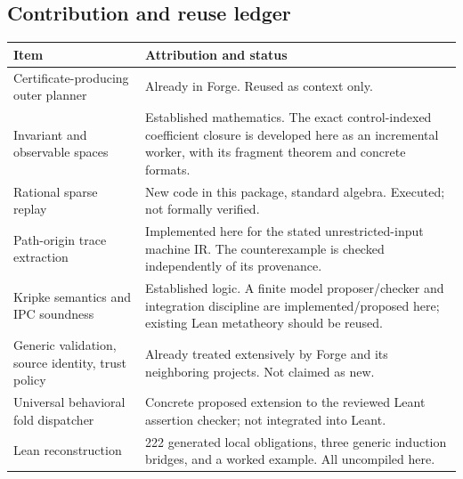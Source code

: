 \subsection{Contribution and reuse ledger}
\begin{longtable}{@{}P{0.31\textwidth}P{0.61\textwidth}@{}}
\toprule
Item & Attribution and status \\
\midrule
\endhead
Certificate-producing outer planner & Already in Forge. Reused as context only. \\
Invariant and observable spaces & Established mathematics. The exact control-indexed coefficient closure is developed here as an incremental worker, with its fragment theorem and concrete formats. \\
Rational sparse replay & New code in this package, standard algebra. Executed; not formally verified. \\
Path-origin trace extraction & Implemented here for the stated unrestricted-input machine IR. The counterexample is checked independently of its provenance. \\
Kripke semantics and IPC soundness & Established logic. A finite model proposer/checker and integration discipline are implemented/proposed here; existing Lean metatheory should be reused. \\
Generic validation, source identity, trust policy & Already treated extensively by Forge and its neighboring projects. Not claimed as new. \\
Universal behavioral fold dispatcher & Concrete proposed extension to the reviewed Leant assertion checker; not integrated into Leant. \\
Lean reconstruction & 222 generated local obligations, three generic induction bridges, and a worked example. All uncompiled here. \\
\bottomrule
\end{longtable}

